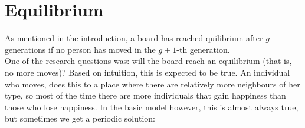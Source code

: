 
\section{Equilibrium}
 As mentioned in the introduction, a board has reached quilibrium after $g$ generations if no  person has moved in the $g+1$-th generation.\\
One of the research questions was: will the board reach an equilibrium (that is, no more moves)? Based on intuition, this is expected to be true. An individual who moves, does this to a place where there are relatively more neighbours of her type, so most of the time there are more individuals that gain happiness than those who lose happiness. In the basic model however, this is almost always true, but sometimes we get a periodic solution:\\

